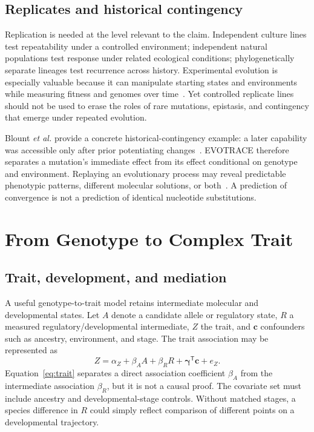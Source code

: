 \documentclass[conference]{IEEEtran}
\begin{document}
\subsection{Replicates and historical contingency}

Replication is needed at the level relevant to the claim. Independent culture lines test repeatability under a controlled environment; independent natural populations test response under related ecological conditions; phylogenetically separate lineages test recurrence across history. Experimental evolution is especially valuable because it can manipulate starting states and environments while measuring fitness and genomes over time~\cite{kawecki2012}. Yet controlled replicate lines should not be used to erase the roles of rare mutations, epistasis, and contingency that emerge under repeated evolution.

Blount \emph{et al.} provide a concrete historical-contingency example: a later capability was accessible only after prior potentiating changes~\cite{blount2008}. EVOTRACE therefore separates a mutation's immediate effect from its effect conditional on genotype and environment. Replaying an evolutionary process may reveal predictable phenotypic patterns, different molecular solutions, or both~\cite{courtier2015}. A prediction of convergence is not a prediction of identical nucleotide substitutions.

\section{From Genotype to Complex Trait}

\subsection{Trait, development, and mediation}

A useful genotype-to-trait model retains intermediate molecular and developmental states. Let $A$ denote a candidate allele or regulatory state, $R$ a measured regulatory/developmental intermediate, $Z$ the trait, and $\mathbf{c}$ confounders such as ancestry, environment, and stage. The trait association may be represented as
\begin{equation}
Z=\alpha_Z+\beta_A A+\beta_R R+\boldsymbol{\gamma}^{\mathsf{T}}\mathbf{c}+e_Z.
\label{eq:trait}
\end{equation}
Equation~\eqref{eq:trait} separates a direct association coefficient $\beta_A$ from the intermediate association $\beta_R$, but it is not a causal proof. The covariate set must include ancestry and developmental-stage controls. Without matched stages, a species difference in $R$ could simply reflect comparison of different points on a developmental trajectory.
\end{document}
